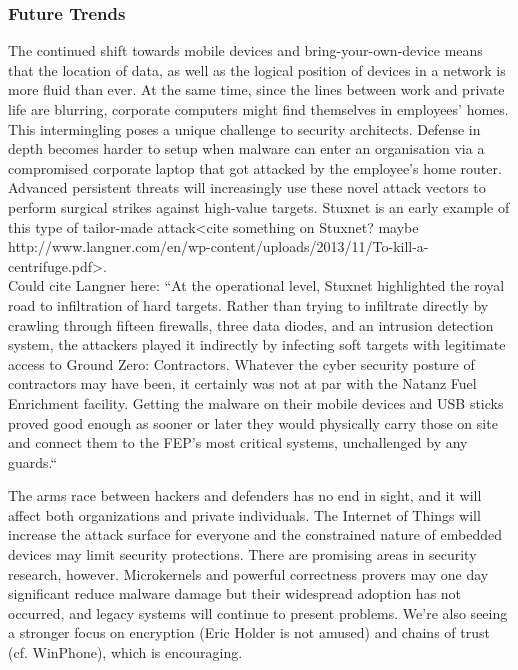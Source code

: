 \documentclass[a4paper]{llncs}
\begin{document}
\subsubsection{Future Trends}
The continued shift towards mobile devices and bring-your-own-device means that the location of data, as well as the logical position of devices in a network is more fluid than ever. At the same time, since the lines between work and private life are blurring, corporate computers might find themselves in employees’ homes. This intermingling poses a unique challenge to security architects. Defense in depth becomes harder to setup when malware can enter an organisation via a compromised corporate laptop that got attacked by the employee’s home router. Advanced persistent threats will increasingly use these novel attack vectors to perform surgical strikes against high-value targets. Stuxnet is an early example of this type of tailor-made attack<cite something on Stuxnet? maybe http://www.langner.com/en/wp-content/uploads/2013/11/To-kill-a-centrifuge.pdf>.\\

Could cite Langner here:
“At the operational level, Stuxnet highlighted the royal road to infiltration of hard targets. Rather than trying to infiltrate directly by crawling through fifteen firewalls, three data diodes, and an intrusion detection system, the attackers played it indirectly by infecting soft targets with legitimate access to Ground Zero: Contractors. Whatever the cyber security posture of contractors may have been, it certainly was not at par with the Natanz Fuel Enrichment facility. Getting the malware on their mobile devices and USB sticks proved good enough as sooner or later they would physically carry those on site and connect them to the FEP’s most critical systems, unchallenged by any guards.“

The arms race between hackers and defenders has no end in sight, and it will affect both organizations and private individuals. The Internet of Things will increase the attack surface for everyone and the constrained nature of embedded devices may limit security protections. There are promising areas in security research, however. Microkernels and powerful correctness provers may one day significant reduce malware damage but their widespread adoption has not occurred, and legacy systems will continue to present problems. We’re also seeing a stronger focus on encryption (Eric Holder is not amused) and chains of trust (cf. WinPhone), which is encouraging. 
\end{document}
